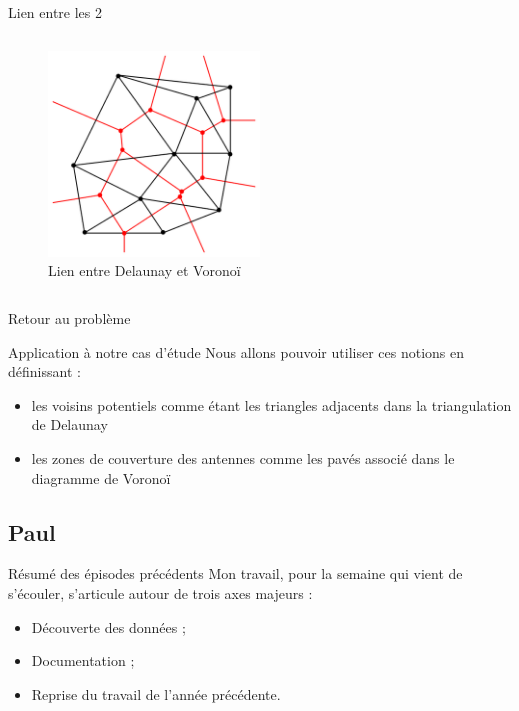 {\begin{frame}{Lien entre les 2}
\begin{columns}
        \begin{column}{0.4\textwidth}
            \begin{figure}
                \includegraphics[width=0.5\textwidth]{images/Delaunay_Voronoi.png}
                \caption{\label{fig:del-vor}Lien entre Delaunay et Voronoï}
            \end{figure}
        \end{column}
    \end{columns} 
\end{frame}

\begin{frame}{Retour au problème}
    \begin{block}{Application à notre cas d'étude}
        Nous allons pouvoir utiliser ces notions en définissant :
        \begin{itemize}
            \item les voisins potentiels comme étant les triangles adjacents dans la triangulation de Delaunay
            \item les zones de couverture des antennes comme les pavés associé dans le diagramme de Voronoï
        \end{itemize}
    \end{block}
\end{frame}
}

\subsection{Paul}
\insertsubsectionframe

\begin{frame}{Résumé des épisodes précédents}
    Mon travail, pour la semaine qui vient de s'écouler, s'articule autour de trois axes majeurs :
    \begin{block}{}
        \begin{itemize}
            \item Découverte des données ;
            \item Documentation ;
            \item Reprise du travail de l'année précédente.
        \end{itemize}
    \end{block}
        
\end{frame}

